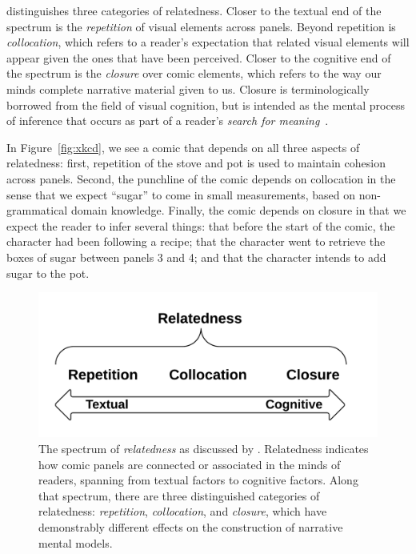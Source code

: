 \citeauthor{saraceni2016relatedness} distinguishes three categories of relatedness.
Closer to the textual end of the spectrum is the \emph{repetition} of visual
elements across panels. Beyond repetition is \emph{collocation}, which refers
to a reader's expectation that related visual elements will appear given the
ones that have been perceived. Closer to the cognitive end of the spectrum is
the \emph{closure} over comic elements, which refers to the way our minds 
complete narrative material given to us. Closure is terminologically borrowed 
from the field of visual cognition, but is intended as the mental process 
of inference that occurs as part of a reader's 
\emph{search for meaning}~\cite{gerrig1994readers}.

In Figure~\ref{fig:xkcd}, we see a comic that depends on all three aspects
of relatedness: first, repetition of the stove and pot is used to maintain
cohesion  across panels. Second, the punchline of
the comic depends on collocation in the sense that we expect ``sugar'' to
come in small measurements, based on non-grammatical domain knowledge.
Finally, the comic depends on closure in that we expect the reader to infer
several things: that before the start of the comic, the character had been
following a recipe; that the character went to retrieve the boxes of sugar
between panels 3 and 4; and that the character intends to add sugar to the
pot.


%
\begin{figure}
	\includegraphics[width=\columnwidth]{relatedness.png}
	\caption{
		The spectrum of \emph{relatedness} as discussed by
		. Relatedness indicates how 
		comic panels are connected or associated in the minds of 
		readers, spanning from textual factors to cognitive factors. 
		Along that spectrum, there are three  distinguished 
		categories of relatedness: \emph{repetition}, 
		\emph{collocation}, and \emph{closure}, which have
		demonstrably different effects on the construction of
		narrative mental models.
		}
	\label{figure:relatedness}
\end{figure}
%
%


